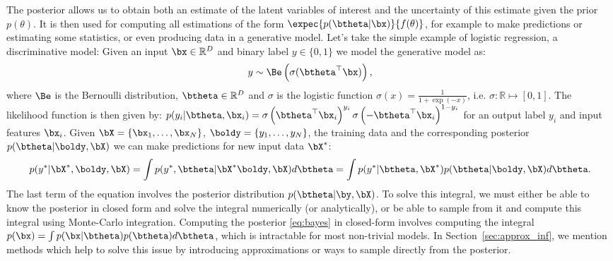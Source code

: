 The posterior allows us to obtain both an estimate of the latent variables of interest and the uncertainty of this estimate given the prior $p(\theta)$.
It is then used for computing all estimations of the form $\expec{p(\btheta|\bx)}{f(\theta)}$, for example to make predictions or estimating some statistics, or even producing data in a generative model.
Let's take the simple example of logistic regression, a discriminative model:
Given an input $\bx \in \mathbb{R}^D$ and binary label $y\in \{ 0, 1\}$ we model the generative model as:
\begin{align}
y \sim \Be\left(\sigma(\btheta^\top \bx)\right),
\end{align}
where $\Be$ is the Bernoulli distribution, $\btheta\in\mathbb{R}^D$ and $\sigma$ is the logistic function $\sigma(x) = \frac{1}{1+\exp(-x)}$, i.e. $\sigma : \mathbb{R} \mapsto [0, 1]$.
The likelihood function is then given by: $p(y_i|\btheta,\bx_i) =\sigma\left(\btheta^\top \bx_i\right)^{y_i}\sigma\left(-\btheta^\top \bx_i\right)^{1-y_i}$ for an output label $y_i$ and input features $\bx_i$.
Given $\bX = \{\bx_1,\ldots,\bx_N\}$, $\boldy = \{y_1,\ldots,y_N\}$, the training data and the corresponding posterior $p(\btheta|\boldy, \bX)$ we can make predictions for new input data $\bX^*$:
\begin{align}
p(y^*|\bX^*,\boldy,\bX) = \int p(y^*, \btheta|\bX^*\boldy, \bX)d\btheta = \int p(y^*|\btheta,\bX^*) p(\btheta|\boldy,\bX)d\btheta.
\end{align}
The last term of the equation involves the posterior distribution $p(\btheta|\by,\bX)$.
To solve this integral, we must either be able to know the posterior in closed form and solve the integral numerically (or analytically), or be able to sample from it and compute this integral using Monte-Carlo integration.
Computing the posterior \eqref{eq:bayes} in closed-form involves computing the integral $p(\bx)=\int p(\bx|\btheta)p(\btheta)d\btheta$, which is intractable for most non-trivial models.
In Section~\ref{sec:approx_inf}, we mention methods which help to solve this issue by introducing approximations or ways to sample directly from the posterior.

